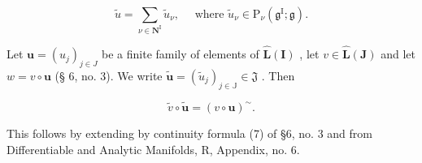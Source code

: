 \[
\tilde {u} = \sum_ {\nu \in \mathbf {N} ^ {\mathrm{I}}}  \tilde {u} _ {\nu}, \quad \text { where } \tilde {u} _ {\nu} \in \mathrm{P} _ {\nu} (\mathfrak {g} ^ {\mathrm{I}}; \mathfrak {g}).
\]

Let \(\pmb{u} = (u_j)_{j\in J}\) be a finite family of elements of \(\hat{\mathbf{L}} (\mathbf{I})\) , let \(v\in \hat{\mathbf{L}} (\mathbf{J})\) and let \(w = v\circ \pmb {u}\) (§ 6, no. 3). We write \(\tilde{\pmb{u}} = (\tilde{u}_j)_{j\in \mathbb{J}}\in \mathfrak{J}\) . Then

\[
\tilde {v} \circ \tilde {\boldsymbol {u}} = (v \circ \boldsymbol {u}) ^ {\sim}.\tag{2}
\]

This follows by extending by continuity formula (7) of §6, no. 3 and from Differentiable and Analytic Manifolds, R, Appendix, no. 6.

